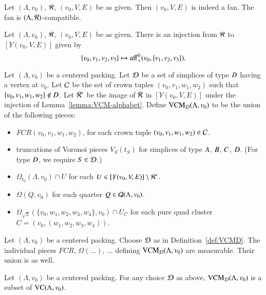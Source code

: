 \begin{lemma}
Let $(\Lambda,v_0)$, ${\mathcal R}$, $(v_0,V,E)$ be as given. Then $(v_0,V,E)$ is indeed a fan.
The fan is $(\Lambda,{\mathcal R})$-compatible.  
\end{lemma}




\begin{lemma}
Let $(\Lambda,v_0)$, ${\mathcal R}$, $(v_0,V,E)$ be as given.  There is an injection from ${\mathcal R}$
to $[Y(v_0,V,E)]$ given by 
  $$
  \{v_0,v_1,v_2,v_3\}\mapsto {\operatorname{aff}}_+^0(v_0,\{v_1,v_2,v_3\}).
  $$
\end{lemma}

\begin{definition}
Let $(\Lambda,v_0)$ be  a centered packing.   
Let ${\mathcal D}$ be a set of simplices of type $D$ having a vertex at $v_0$.  Let ${\mathcal C}$ be the
set of crown tuples $(v_0,v_1,w_1,w_2)$ such that $\{v_0,v_1,w_1,w_2\}\not\in D$. 
Let ${\mathcal R}'$ be the image
of ${\mathcal R}$ in $[Y(v_0,V,E)]$ under the injection of Lemma~\ref{lemma:VCM-alphabet}.
Define ${\operatorname{VCM}}_{{\mathcal D}}(\Lambda,v_0)$ to be the union of the following pieces:
    \begin{itemize}
    \item $FCR(v_0,v_1,w_1,w_2)$, for each crown tuple $(v_0,v_1,w_1,w_2)\in{\mathcal C}$.
    \item truncations of Voronoi pieces $V_S(t_S)$ for simplices of type
        $A$, $B$,  $C$, $D$.  (For type $D$, we require $S\in {\mathcal D}$.)
    \item $\Omega_{t_0}(\Lambda,v_0)\cap U$ for each $U\in[Y(v_0,V,E)]\setminus {\mathcal R}'$.
    \item $\Omega(Q,v_0)$ for each quarter $Q\in{\mathcal Q}(\Lambda,v_0)$.
    \item $\Omega_{\sqrt2}(\{v_0,w_1,w_2,w_3,w_4\},v_0)\cap U_C$ 
     for each pure quad
     cluster $C=(v_0,(w_1,w_2,w_3,w_4))$.
    \end{itemize}
\end{definition}

\begin{lemma}
Let $(\Lambda,v_0)$ be a centered packing.  Choose ${\mathcal D}$ as in Definition~\ref{def:VCMD}.  
The individual pieces $FCR$, $\Omega(\ldots)$, $\ldots$ 
defining ${\operatorname{VCM}}_{{\mathcal D}}(\Lambda,v_0)$ are measurable.  Their union is as well.
\end{lemma}

\begin{lemma}
Let $(\Lambda,v_0)$ be a centered packing.
For any choice ${\mathcal D}$ as above,  ${\operatorname{VCM}}_{{\mathcal D}}(\Lambda,v_0)$ is a subset of ${\operatorname{VC}}(\Lambda,v_0)$.
\end{lemma}

